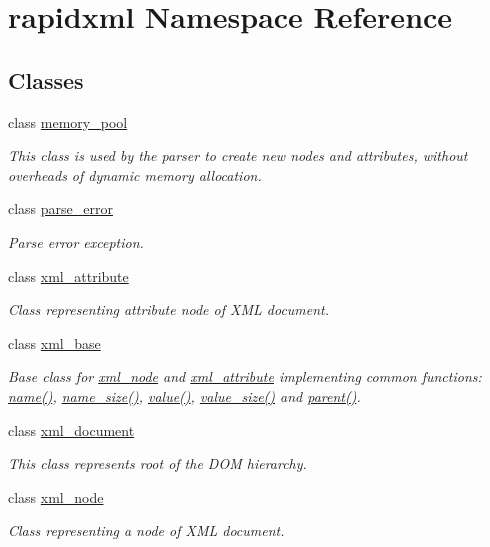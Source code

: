 \hypertarget{namespacerapidxml}{}\section{rapidxml Namespace Reference}
\label{namespacerapidxml}
\subsection*{Classes}
\begin{DoxyCompactItemize}
\item 
class \mbox{\hyperlink{classrapidxml_1_1memory__pool}{memory\+\_\+pool}}
\begin{DoxyCompactList}\small\item\em This class is used by the parser to create new nodes and attributes, without overheads of dynamic memory allocation. \end{DoxyCompactList}\item 
class \mbox{\hyperlink{classrapidxml_1_1parse__error}{parse\+\_\+error}}
\begin{DoxyCompactList}\small\item\em Parse error exception. \end{DoxyCompactList}\item 
class \mbox{\hyperlink{classrapidxml_1_1xml__attribute}{xml\+\_\+attribute}}
\begin{DoxyCompactList}\small\item\em Class representing attribute node of X\+ML document. \end{DoxyCompactList}\item 
class \mbox{\hyperlink{classrapidxml_1_1xml__base}{xml\+\_\+base}}
\begin{DoxyCompactList}\small\item\em Base class for \mbox{\hyperlink{classrapidxml_1_1xml__node}{xml\+\_\+node}} and \mbox{\hyperlink{classrapidxml_1_1xml__attribute}{xml\+\_\+attribute}} implementing common functions\+: \mbox{\hyperlink{classrapidxml_1_1xml__base_af8436e9ee14c127220113eaa956eafee}{name()}}, \mbox{\hyperlink{classrapidxml_1_1xml__base_ad01e2eff02202b130baad012d1ed7328}{name\+\_\+size()}}, \mbox{\hyperlink{classrapidxml_1_1xml__base_a558b1045e6751e4024309d41bf35c542}{value()}}, \mbox{\hyperlink{classrapidxml_1_1xml__base_aa6981b3244607ea4ae7634f74f25361b}{value\+\_\+size()}} and \mbox{\hyperlink{classrapidxml_1_1xml__base_a7f177e162f72f65ea1f0f0188e41c1ba}{parent()}}. \end{DoxyCompactList}\item 
class \mbox{\hyperlink{classrapidxml_1_1xml__document}{xml\+\_\+document}}
\begin{DoxyCompactList}\small\item\em This class represents root of the D\+OM hierarchy. \end{DoxyCompactList}\item 
class \mbox{\hyperlink{classrapidxml_1_1xml__node}{xml\+\_\+node}}
\begin{DoxyCompactList}\small\item\em Class representing a node of X\+ML document. \end{DoxyCompactList}\end{DoxyCompactItemize}
